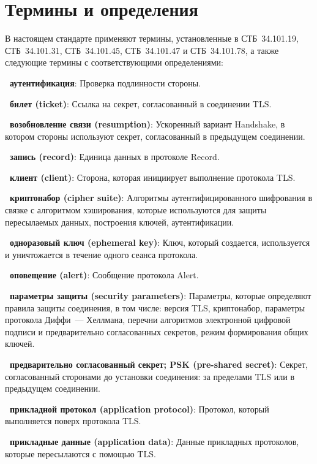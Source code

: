 \chapter{Термины и определения}\label{TERMS}

В настоящем стандарте применяют термины, установленные в СТБ~34.101.19, 
СТБ~34.101.31, СТБ~34.101.45, СТБ~34.101.47 и СТБ~34.101.78, а также следующие 
термины с соответствующими определениями: 

{\bf \thedefctr~аутентификация}:
Проверка подлинности стороны.

{\bf \thedefctr~билет (ticket)}:
Ссылка на секрет, согласованный в соединении TLS.

{\bf \thedefctr~возобновление связи (resumption)}: 
Ускоренный вариант Handshake, в котором стороны используют секрет, 
согласованный в предыдущем соединении.

{\bf \thedefctr~запись (record)}:
Единица данных в протоколе Record.

{\bf \thedefctr~клиент (client)}:
Сторона, которая инициирует выполнение протокола TLS.


{\bf \thedefctr~криптонабор (cipher suite)}:
Алгоритмы аутентифицированного шифрования в связке с алгоритмом хэширования,
которые используются для защиты пересылаемых данных, построения ключей, 
аутентификации.

{\bf \thedefctr~одноразовый ключ (ephemeral key)}:
Ключ, который создается, используется и уничтожается в течение одного сеанса 
протокола.


{\bf \thedefctr~оповещение (alert)}:
Сообщение протокола Alert.

{\bf \thedefctr~параметры защиты (security parameters)}:
Параметры, которые определяют правила защиты соединения, в том числе: 
версия TLS, криптонабор, параметры протокола Диффи~--- Хеллмана, перечни 
алгоритмов электронной цифровой подписи и предварительно согласованных 
секретов, режим формирования общих ключей.

{\bf \thedefctr~предварительно согласованный секрет; PSK (pre-shared secret)}:
Секрет, согласованный сторонами до установки соединения: за пределами TLS или в 
предыдущем соединении.

{\bf \thedefctr~прикладной протокол (application protocol)}:
Протокол, который выполняется поверх протокола TLS.

{\bf \thedefctr~прикладные данные (application data)}:
Данные прикладных протоколов, которые пересылаются с помощью TLS.

